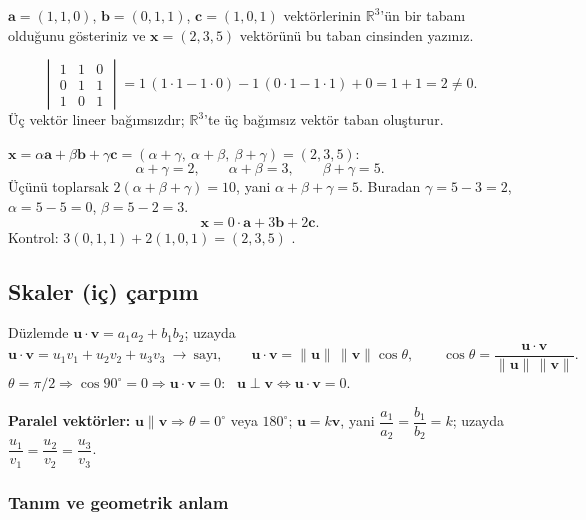 \begin{soru}
$\mathbf a=(1,1,0)$, $\mathbf b=(0,1,1)$, $\mathbf c=(1,0,1)$ vektörlerinin $\mathbb R^3$'ün bir tabanı olduğunu gösteriniz ve $\mathbf x=(2,3,5)$ vektörünü bu taban cinsinden yazınız.
\end{soru}
\begin{cevap}
\[
\begin{vmatrix}1&1&0\\0&1&1\\1&0&1\end{vmatrix}
=1\,(1\cdot1-1\cdot0)-1\,(0\cdot1-1\cdot1)+0=1+1=2\neq0 .
\]
Üç vektör lineer bağımsızdır; $\mathbb R^3$'te üç bağımsız vektör taban oluşturur.

$\mathbf x=\alpha\mathbf a+\beta\mathbf b+\gamma\mathbf c=(\alpha+\gamma,\ \alpha+\beta,\ \beta+\gamma)=(2,3,5)$:
\[
\alpha+\gamma=2,\qquad \alpha+\beta=3,\qquad \beta+\gamma=5 .
\]
Üçünü toplarsak $2(\alpha+\beta+\gamma)=10$, yani $\alpha+\beta+\gamma=5$. Buradan $\gamma=5-3=2$, $\alpha=5-5=0$, $\beta=5-2=3$.
\[
\mathbf x=0\cdot\mathbf a+3\mathbf b+2\mathbf c .
\]
Kontrol: $3(0,1,1)+2(1,0,1)=(2,3,5)$ \checkmark.
\end{cevap}

\subsection{Skaler (iç) çarpım}

\begin{tahta}
Düzlemde $\mathbf u\cdot\mathbf v=a_1a_2+b_1b_2$; uzayda
\[
\boxed{\mathbf u\cdot\mathbf v=u_1v_1+u_2v_2+u_3v_3}\ \to\ \text{sayı},\qquad
\mathbf u\cdot\mathbf v=\|\mathbf u\|\,\|\mathbf v\|\cos\theta,\qquad
\cos\theta=\frac{\mathbf u\cdot\mathbf v}{\|\mathbf u\|\,\|\mathbf v\|}.
\]
$\theta=\pi/2\Rightarrow\cos 90^\circ=0\Rightarrow\mathbf u\cdot\mathbf v=0$: \ $\mathbf u\perp\mathbf v\iff\mathbf u\cdot\mathbf v=0$.

\textbf{Paralel vektörler:} $\mathbf u\parallel\mathbf v\Rightarrow\theta=0^\circ$ veya $180^\circ$; $\mathbf u=k\mathbf v$, yani $\dfrac{a_1}{a_2}=\dfrac{b_1}{b_2}=k$; uzayda $\dfrac{u_1}{v_1}=\dfrac{u_2}{v_2}=\dfrac{u_3}{v_3}$.
\end{tahta}

\subsubsection{Tanım ve geometrik anlam}

